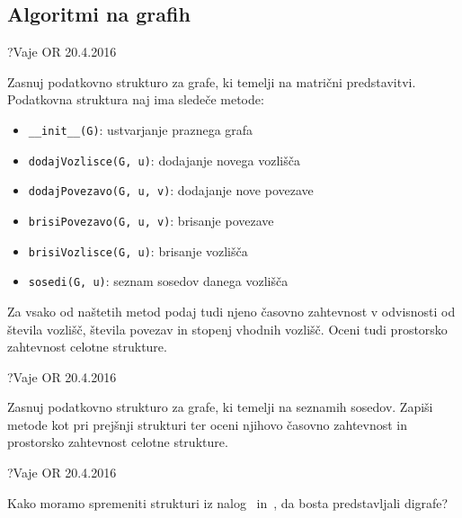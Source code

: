 \subsection{Algoritmi na grafih}

\begin{naloga}{?}{Vaje OR 20.4.2016}
\begin{vprasanje}[matgraf]
Zasnuj podatkovno strukturo za grafe,
ki temelji na matrični predstavitvi.
Podatkovna struktura naj ima sledeče metode:
\begin{itemize}
\item {\tt \_\_init\_\_(G)}: ustvarjanje praznega grafa
\item {\tt dodajVozlisce(G, u)}: dodajanje novega vozlišča
\item {\tt dodajPovezavo(G, u, v)}: dodajanje nove povezave
\item {\tt brisiPovezavo(G, u, v)}: brisanje povezave
\item {\tt brisiVozlisce(G, u)}: brisanje vozlišča
\item {\tt sosedi(G, u)}: seznam sosedov danega vozlišča
\end{itemize}
Za vsako od naštetih metod podaj tudi njeno časovno zahtevnost
v odvisnosti od števila vozlišč, števila povezav in stopenj vhodnih vozlišč.
Oceni tudi prostorsko zahtevnost celotne strukture.
\end{vprasanje}
\begin{odgovor}
\end{odgovor}
\end{naloga}


\begin{naloga}{?}{Vaje OR 20.4.2016}
\begin{vprasanje}[sosgraf]
Zasnuj podatkovno strukturo za grafe,
ki temelji na seznamih sosedov.
Zapiši metode kot pri prejšnji strukturi
ter oceni njihovo časovno zahtevnost
in prostorsko zahtevnost celotne strukture.
\end{vprasanje}
\begin{odgovor}
\end{odgovor}
\end{naloga}


\begin{naloga}{?}{Vaje OR 20.4.2016}
\begin{vprasanje}
Kako moramo spremeniti strukturi
iz nalog~ in~,
da bosta predstavljali digrafe?
\end{vprasanje}
\begin{odgovor}
\end{odgovor}
\end{naloga}


